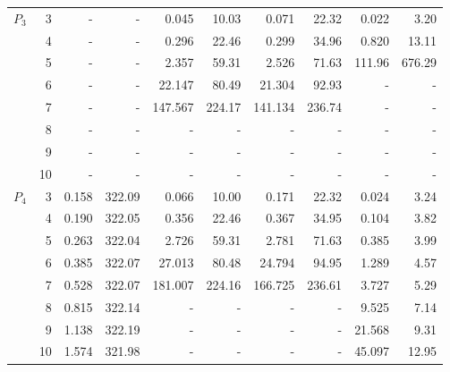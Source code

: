 \begin{figure}[h!]
\begin{tabular}{| r | r | r | r | r | r | r | r | r | r |}
		\multirow{6}{*}{$P_3$} & 3 & - & - & 0.045 & 10.03 & 0.071 & 22.32 & 0.022 & 3.20  \\
		{} & 4 & - & - & 0.296 & 22.46 & 0.299 & 34.96 & 0.820 & 13.11  \\
		{} & 5 & - & - & 2.357 & 59.31 & 2.526 & 71.63 & 111.96 & 676.29  \\
		{} & 6 & - & - & 22.147 & 80.49 & 21.304 & 92.93 & - & -  \\
		{} & 7 & - & - & 147.567 & 224.17 & 141.134 & 236.74 & - & -  \\
		{} & 8 & - & - & - & - & - & - & - & -  \\
		{} & 9 & - & - & - & - & - & - & - & -  \\
		{} & 10 & - & - & - & - & - & - & - & -  \\
		\hline
		\multirow{6}{*}{$P_4$} & 3 & 0.158 & 322.09 & 0.066 & 10.00 & 0.171 & 22.32 & 0.024 & 3.24  \\
		{} & 4 & 0.190 & 322.05 & 0.356 & 22.46 & 0.367 & 34.95 & 0.104 & 3.82  \\
		{} & 5 & 0.263 & 322.04 & 2.726 & 59.31 & 2.781 & 71.63 & 0.385 & 3.99  \\
		{} & 6 & 0.385 & 322.07 & 27.013 & 80.48 & 24.794 & 94.95 & 1.289 & 4.57  \\
		{} & 7 & 0.528 & 322.07 & 181.007 & 224.16 & 166.725 & 236.61 & 3.727 & 5.29  \\
		{} & 8 & 0.815 & 322.14 & - & - & - & - & 9.525 & 7.14  \\
		{} & 9 & 1.138 & 322.19 & - & - & - & - & 21.568 & 9.31  \\
		{} & 10 & 1.574 & 321.98 & - & - & - & - & 45.097 & 12.95  \\
		\hline
	\end{tabular}
	
	\label{tabl:data:ring}
\end{figure}

